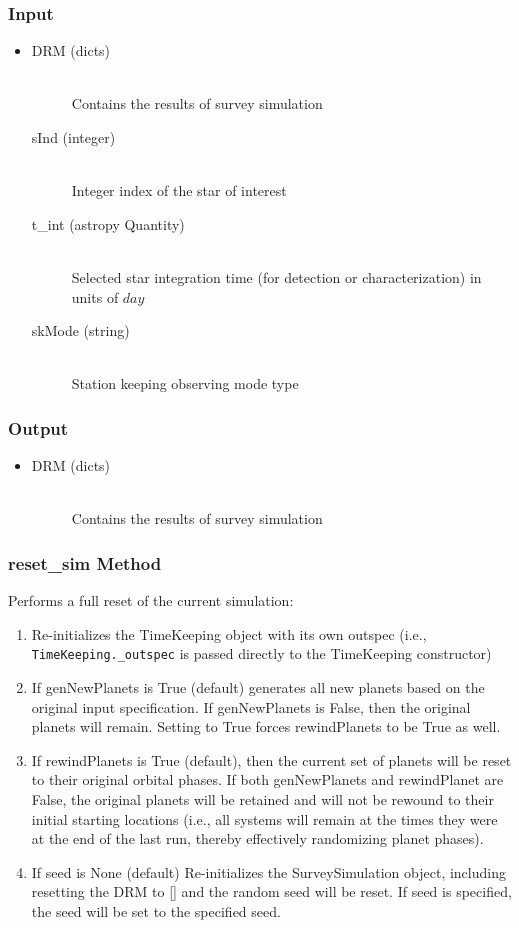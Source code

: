 \documentclass[cleanfoot]{asme2ej}
\begin{document}
\subsubsection*{Input}
\begin{itemize}
\item
\begin{description}
    \item[DRM (dicts)] \hfill \\ Contains the results of survey simulation
    \item[sInd (integer)] \hfill \\ Integer index of the star of interest
    \item[t\_int (astropy Quantity)] \hfill \\ Selected star integration time (for detection or characterization) in units of $day$
    \item[skMode (string)] \hfill \\ Station keeping observing mode type
\end{description}
\end{itemize}
\subsubsection*{Output}
\begin{itemize}
\item
\begin{description}
    \item[DRM (dicts)] \hfill \\ Contains the results of survey simulation
\end{description}
\end{itemize}

\subsubsection{reset\_sim Method} \label{sec:resetsimtask}
Performs a full reset of the current simulation:
\begin{enumerate}
    \item  Re-initializes the TimeKeeping object with its own outspec (i.e., \verb+TimeKeeping._outspec+ is passed directly to the TimeKeeping constructor)
    \item  If genNewPlanets is True (default) generates all new planets based on the original input specification. If genNewPlanets is False, then the original planets will remain. Setting to True forces rewindPlanets to be True as well.
    \item  If rewindPlanets is True (default), then the current set of planets will be reset to their original orbital phases. If both genNewPlanets and rewindPlanet are False, the original planets will be retained and will not be rewound to their initial starting locations (i.e., all systems will remain at the times they were at the end of the last run, thereby effectively randomizing planet phases).
    \item If seed is None (default) Re-initializes the SurveySimulation object, including resetting the DRM to [] and the random seed will be reset. If seed is specified, the seed will be set to the specified seed.
\end{enumerate}
\end{document}
